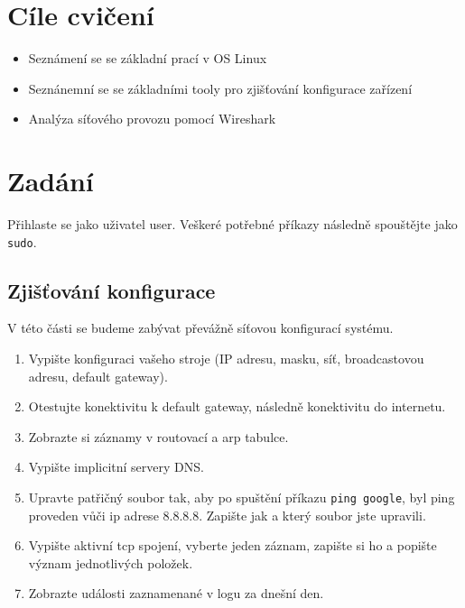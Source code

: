 \section{Cíle cvičení}
\begin{itemize}
	\item Seznámení se se základní prací v OS Linux
	\item Seznánemní se se základními tooly pro zjišťování konfigurace zařízení
	\item Analýza síťového provozu pomocí Wireshark
\end{itemize}

\section{Zadání}
Přihlaste se jako uživatel user. Veškeré potřebné příkazy následně spouštějte jako \texttt{sudo}.
\subsection{Zjišťování konfigurace}
V této části se budeme zabývat převážně síťovou konfigurací systému.
\begin{enumerate}
\item Vypište konfiguraci vašeho stroje (IP adresu, masku, síť, broadcastovou adresu, default gateway).
\item Otestujte konektivitu k default gateway, následně konektivitu do internetu.
\item Zobrazte si záznamy v routovací a arp tabulce.
\item Vypište implicitní servery DNS.
\item Upravte patřičný soubor tak, aby po spuštění příkazu \texttt{ping google}, byl ping proveden vůči ip adrese 8.8.8.8. Zapište jak a který soubor jste upravili.
\item Vypište aktivní tcp spojení, vyberte jeden záznam, zapište si ho a popište význam jednotlivých položek.
\item Zobrazte události zaznamenané v logu za dnešní den.
\end{enumerate}

